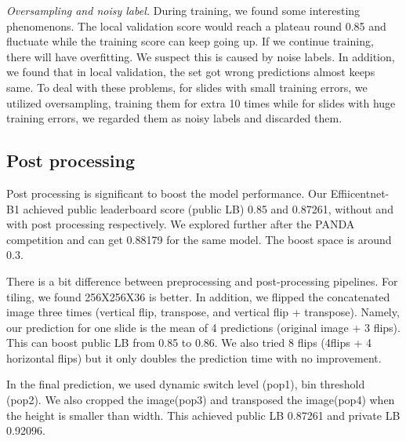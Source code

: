 \documentclass{article}
\begin{document}
\textit{Oversampling and noisy label.} During training, we found some interesting phenomenons. The local validation score would reach a plateau round 0.85 and fluctuate while the training score can keep going up. If we continue training, there will have overfitting. We suspect this is caused by noise labels. In addition, we found that in local validation, the set got wrong predictions almost keeps same. To deal with these problems, for slides with small training errors, we utilized oversampling, training them for extra 10 times while for slides with huge training errors, we regarded them as noisy labels and discarded them.


\subsection{Post processing}

Post processing is significant to boost the model performance. Our Effiicentnet-B1 achieved public leaderboard score (public LB)  0.85 and 0.87261, without and with post processing respectively. We explored further after the PANDA competition and can get 0.88179 for the same model. The boost space is around 0.3. 

There is a bit difference between preprocessing and post-processing pipelines. For tiling, we found 256X256X36 is better. In addition, we flipped the concatenated image three times (vertical flip, transpose, and vertical flip + transpose). Namely, our prediction for one slide is the mean of 4 predictions (original image + 3 flips). This can boost public LB from 0.85 to 0.86. We also tried 8 flips (4flips + 4 horizontal flips) but it only doubles the prediction time with no improvement. 

In the final prediction, we used dynamic switch level (pop1), bin threshold (pop2). We also cropped the image(pop3) and transposed the image(pop4) when the height is smaller than width. This achieved public LB 0.87261 and private LB 0.92096.  
\end{document}
